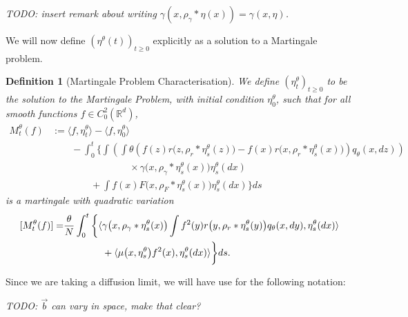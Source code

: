 \documentclass[12pt]{article}
\newtheorem{definition}[theorem]{Definition}
\newcommand{\meanq}{\vec b}    %
\newcommand{\kernel}{\rho}  %
\newcommand{\smooth}[1]{\kernel_{#1} \! * \!}  %
\newcommand{\comment}[1]{{\color{blue} \it #1}}
\begin{document}
\comment{TODO: insert remark about writing $\gamma(x, \smooth{\gamma}\eta(x)) = \gamma(x, \eta)$.}

We will now define $(\eta^{\theta}(t))_{t \geq 0}$
explicitly as a solution to a Martingale problem.

\begin{definition}[Martingale Problem Characterisation]
    \label{Def: Rescaled Models}
We define $(\eta^{\theta}_t)_{t \geq 0}$ to be the solution to the Martingale Problem,
with initial condition $\eta^{\theta}_0$,
such that for all smooth functions $f \in C^{2}_{0}(\mathbb{R}^d)$,
\begin{equation}
    \label{eq: Pre-limit Martingale Characterisation}
\begin{aligned}
M^{\theta}_t(f)
&:=  \langle f,\eta^{\theta}_t \rangle
        -\langle f,\eta^{\theta}_0 \rangle
 \\ &\qquad {}
 -  \int_{0}^{t}\bigg\{
        \int\left(   \int \theta
     \left(
        f(z)r\big(z,\rho_{r}*\eta^{\theta}_{s}(z)\big)
            -f(x)r\big(x,\rho_{r}*\eta^{\theta}_{s}(x)\big)
            \right)
                    q_\theta(x,dz)\right)
        \\ & \qquad \qquad \qquad \qquad {} \times
                            \gamma\big(x,\rho_{\gamma}*\eta^{\theta}_{s}(x)\big)
                            \eta^{\theta}_{s}(dx)
     \\ & \qquad \qquad {} +\int 
     f(x)F\big(x,\rho_{F}*\eta^{\theta}_{s}(x)\big)
     \eta^{\theta}_{s}(dx)
    \bigg\} ds
\end{aligned}    
\end{equation}
is a martingale with quadratic variation
\begin{equation}
\begin{aligned} \relax
[ M^{\theta}_t(f)] =& 
\frac{\theta}{N} \int_{0}^{t}\bigg\{
\langle \gamma\big(x,\rho_{\gamma}*\eta^{\theta}_{s}(x)\big)
\int f^2(y)r\big(y,\rho_{r}*\eta^{\theta}_{s}(y)\big)q_\theta(x,dy) 
,\eta^{\theta}_{s}(dx)\rangle\\
& \qquad \qquad +\langle \mu\big(x,\eta^{\theta}_{s}\big)f^2(x) 
,\eta^{\theta}_{s}(dx)\rangle \bigg\}ds. 
\end{aligned}    
\end{equation}


\end{definition}

Since we are taking a diffusion limit,
we will have use for the following notation:

\comment{TODO: $\meanq$ can vary in space, make that clear?}
\end{document}
